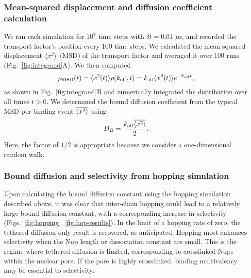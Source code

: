 \subsubsection{Mean-squared displacement and diffusion coefficient calculation}
We ran each simulation for $10^7$ time steps with $\delta t = 0.01$ $\mu$s, and recorded the transport factor's position every 100 time steps.  We calculated the mean-squared displacement $\langle x^2 \rangle$ (MSD) of the transport factor and averaged it over 100 runs (Fig.~\ref{fig:integrand}A).  We then computed
\begin{equation}
\rho_{\mathrm{MSD}} (t)= \langle x^2(t) \rangle \rho(k_{\rm off},t) = k_{\rm off} \langle x^2(t) \rangle
e^{-k_{\rm off} t}, 
\end{equation}
as shown in Fig.~\ref{fig:integrand}B and numerically integrated the distribution over all times $t > 0$. We determined the bound diffusion coefficient from the typical MSD-per-binding-event $\overline{\langle x^2 \rangle}$ using
\begin{equation}
D_B = \frac{k_{\rm off} \overline{\langle x^2 \rangle}}{2}. 
\end{equation}   
Here, the factor of $1/2$ is appropriate because we consider a one-dimensional random walk.

\subsubsection{Bound diffusion and selectivity from hopping simulation}

Upon calculating the bound diffusion constant using the hopping simulation described above, it was clear that inter-chain hopping could lead to a relatively large bound diffusion constant, with a corresponding increase in selectivity (Figs.~\ref{fig:hopping}, \ref{fig:hop-results}).  In the limit of a hopping rate of zero, the tethered-diffusion-only result is recovered, as anticipated.  Hopping most enhances selectivity when the Nup length or dissociation constant are small.  This is the regime where tethered diffusion is limited, corresponding to crosslinked Nups within the nuclear pore.  If the pore is highly crosslinked, binding multivalency may be essential to selectivity.

